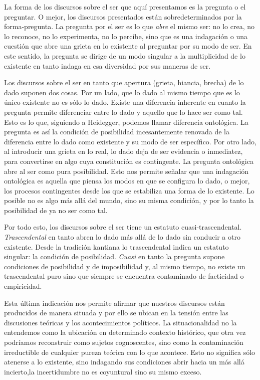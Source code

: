 La forma de los discursos sobre el ser que aquí presentamos es la pregunta o el preguntar. O mejor, los discursos presentados están sobredeterminados por la forma-pregunta. La pregunta por el ser es lo que \emph{abre} el mismo ser: no lo crea, no lo reconoce, no lo experimenta, no lo percibe, sino que es una indagación o una cuestión que abre una grieta en lo existente al preguntar por su modo de ser. En este sentido, la pregunta se dirige de un modo singular a la multiplicidad de lo existente en tanto indaga en esa diversidad por sus maneras de ser.

Los discursos sobre el ser en tanto que apertura (grieta, hiancia, brecha) de lo dado suponen dos cosas. Por un lado, que lo dado al mismo tiempo que es lo único existente no es sólo lo dado. Existe una diferencia inherente en cuanto la pregunta permite diferenciar entre lo dado y aquello que lo hace ser como tal. Esto es lo que, siguiendo a Heidegger, podemos llamar diferencia ontológica. La pregunta es así la condición de posibilidad incesantemente renovada de la diferencia entre lo dado como existente y su modo de ser específico. Por otro lado, al introducir una grieta en lo real, lo dado deja de ser evidencia o inmediatez, para convertirse en algo cuya constitución es contingente. La pregunta ontológica abre al ser como pura posibilidad. Esto nos permite señalar que una indagación ontológica es aquella que piensa los modos en que se configura lo dado, o mejor, los procesos contingentes desde los que se estabiliza una forma de lo existente. Lo posible no es algo más allá del mundo, sino su misma condición, y por lo tanto la posibilidad de ya no ser como tal.

Por todo esto, los discursos sobre el ser  tiene un estatuto cuasi-trascendental. \emph{Trascendental} en tanto abren lo dado más allá de lo dado sin conducir a otro existente. Desde la tradición kantiana lo trascendental indica un estatuto singular: la condición de posibilidad. \emph{Cuasi} en tanto la pregunta supone condiciones de posibilidad y de imposibilidad y, al mismo tiempo, no existe un trascendental puro sino que siempre se encuentra contaminado de facticidad o empiricidad.

Esta última indicación nos permite afirmar que nuestros discursos están producidos de manera situada y por ello se ubican en la tensión entre las discusiones teóricas y los acontecimientos políticos. La situacionalidad no la entendemos como la ubicación en determinado contexto histórico, que otra vez podríamos reconstruir como sujetos cognoscentes, sino como la contaminación irreductible de cualquier pureza teórica con lo que acontece. Esto no significa sólo atenerse a lo existente, sino indagando sus condiciones abrir hacia un más allá incierto,la incertidumbre no es coyuntural sino su mismo exceso.

